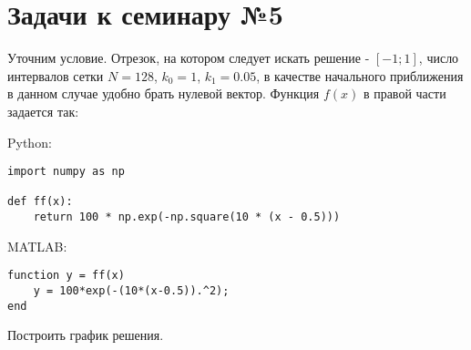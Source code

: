 \newpage

\section*{Задачи к семинару №5}
Уточним условие. Отрезок, на котором следует искать решение - $[-1; 1]$, число интервалов сетки $N = 128$, $k_0 = 1$, $k_1 = 0.05$, в качестве начального приближения в данном случае удобно брать нулевой вектор. Функция $f(x)$ в правой части задается так:

Python:
\begin{verbatim}
import numpy as np

def ff(x):
    return 100 * np.exp(-np.square(10 * (x - 0.5)))
\end{verbatim}
MATLAB:
\begin{matlablisting}
	\begin{verbatim}
function y = ff(x)
    y = 100*exp(-(10*(x-0.5)).^2);
end
	\end{verbatim}
\end{matlablisting}

Построить график решения.
